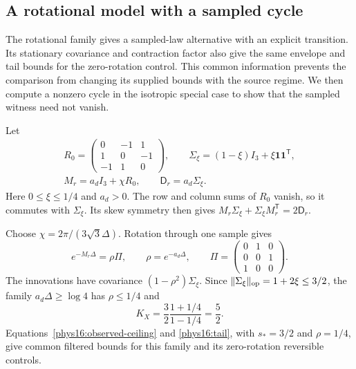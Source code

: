 \subsection{A rotational model with a sampled cycle}

The rotational family gives a sampled-law alternative with an explicit transition. Its stationary covariance and contraction factor also give the same envelope and tail bounds for the zero-rotation control. This common information prevents the comparison from changing its supplied bounds with the source regime. We then compute a nonzero cycle in the isotropic special case to show that the sampled witness need not vanish.

Let
\begin{equation}
 \begin{gathered}
 R_0=\begin{pmatrix}0&-1&1\\1&0&-1\\-1&1&0\end{pmatrix},
 \qquad \Sigma_\xi=(1-\xi)I_3+\xi\mathbf1\mathbf1^{\mathsf T},\\
 M_r=a_dI_3+\chi R_0,\qquad\mathsf D_r=a_d\Sigma_\xi.
 \end{gathered}
 \label{phys16:ring}
\end{equation}
Here $0\le\xi\le1/4$ and $a_d>0$. The row and column sums of $R_0$ vanish, so it commutes with $\Sigma_\xi$. Its skew symmetry then gives
$M_r\Sigma_\xi+\Sigma_\xi M_r^{\mathsf T}=2\mathsf D_r$.

Choose $\chi=2\pi/(3\sqrt3\Delta)$. Rotation through one sample gives
\begin{equation}
 e^{-M_r\Delta}=\rho\Pi,
 \qquad \rho=e^{-a_d\Delta},
 \qquad
 \Pi=\begin{pmatrix}0&1&0\\0&0&1\\1&0&0\end{pmatrix}.
 \label{phys16:permutation}
\end{equation}
The innovations have covariance $(1-\rho^2)\Sigma_\xi$. Since $\|\Sigma_\xi\|_{\rm op}=1+2\xi\le3/2$, the family $a_d\Delta\ge\log4$ has $\rho\le1/4$ and
\begin{equation}
 K_X=\frac32\frac{1+1/4}{1-1/4}=\frac52.
 \label{phys16:ring-ceiling}
\end{equation}
Equations~\eqref{phys16:observed-ceiling} and \eqref{phys16:tail}, with $s_*=3/2$ and $\rho=1/4$, give common filtered bounds for this family and its zero-rotation reversible controls.

